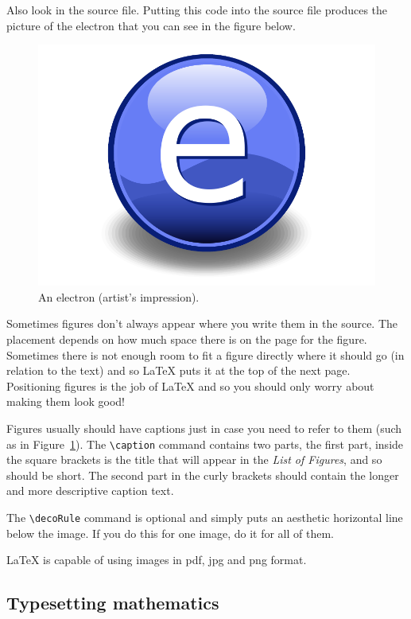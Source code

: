 Also look in the source file. Putting this code into the source file produces
the picture of the electron that you can see in the figure below.


\begin{figure}[th]
\centering
\includegraphics{Figures/Electron}
\decoRule
\caption[An Electron]{An electron (artist's impression).}
\label{fig:Electron}
\end{figure}

Sometimes figures don't always appear where you write them in the source. The placement depends on how much space there is on the page for the figure. Sometimes there is not enough room to fit a figure directly where it should go (in relation to the text) and so \LaTeX{} puts it at the top of the next page. Positioning figures is the job of \LaTeX{} and so you should only worry about making them look good!

Figures usually should have captions just in case you need to refer to them (such as in Figure~\ref{fig:Electron}). The \verb|\caption| command contains two parts, the first part, inside the square brackets is the title that will appear in the \emph{List of Figures}, and so should be short. The second part in the curly brackets should contain the longer and more descriptive caption text.

The \verb|\decoRule| command is optional and simply puts an aesthetic horizontal line below the image. If you do this for one image, do it for all of them.

\LaTeX{} is capable of using images in pdf, jpg and png format.

\subsection{Typesetting mathematics}

